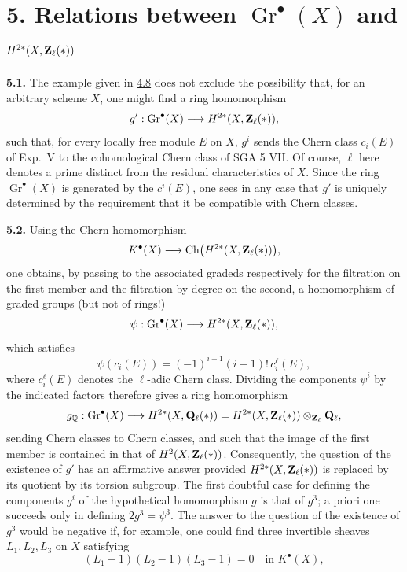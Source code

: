 \section*{5. Relations between $\operatorname{Gr}^\bullet(X)$ and
$H^{2*}(X,\mathbf Z_\ell(*))$}

\noindent{}\textbf{5.1.}
The example given in \hyperlink{sga6.e14.para.4-8}{4.8} does not exclude the possibility that, for an
arbitrary scheme $X$, one might find a ring homomorphism
\[
 g':\operatorname{Gr}^\bullet(X)
 \longrightarrow H^{2*}(X,\mathbf Z_\ell(*)),
\]
such that, for every locally free module $E$ on $X$, $g^i$ sends the Chern
class $c_i(E)$ of Exp.~V to the cohomological Chern class of SGA 5 VII. Of
course, $\ell$ here denotes a prime distinct from the residual
characteristics of $X$. Since the ring $\operatorname{Gr}^\bullet(X)$ is
generated by the $c^i(E)$, one sees in any case that $g'$ is uniquely
determined by the requirement that it be compatible with Chern classes.

\noindent{}\textbf{5.2.}
Using the Chern homomorphism
\[
 K^\bullet(X)\longrightarrow
 \operatorname{Ch}\bigl(H^{2*}(X,\mathbf Z_\ell(*))\bigr),
\]
one obtains, by passing to the associated gradeds respectively for the
filtration on the first member and the filtration by degree on the second,
a homomorphism of graded groups (but not of rings!)
\[
 \psi:\operatorname{Gr}^\bullet(X)
 \longrightarrow H^{2*}(X,\mathbf Z_\ell(*)),
\]
which satisfies
\[
 \psi(c_i(E))=(-1)^{i-1}(i-1)!\,c_i^\ell(E),
\]
where $c_i^\ell(E)$ denotes the $\ell$-adic Chern class. Dividing the
components $\psi^i$ by the indicated factors therefore gives a ring
homomorphism
\[
 g_\mathbb Q:\operatorname{Gr}^\bullet(X)
 \longrightarrow H^{2*}(X,\mathbf Q_\ell(*))
 =H^{2*}(X,\mathbf Z_\ell(*))\otimes_{\mathbf Z_\ell}\mathbf Q_\ell,
\]
sending Chern classes to Chern classes, and such that the image of the first
member is contained in that of $H^2(X,\mathbf Z_\ell(*))$. Consequently, the question
of the existence of $g'$ has an affirmative answer provided
$H^{2*}(X,\mathbf Z_\ell(*))$ is replaced by its quotient by its torsion subgroup.
The first doubtful case for defining the components $g^i$ of the
hypothetical homomorphism $g$ is that of $g^3$; a priori one succeeds only
in defining $2g^3=\psi^3$. The answer to the question of the existence of
$g^3$ would be negative if, for example, one could find three invertible
sheaves $L_1,L_2,L_3$ on $X$ satisfying
\[
 (L_1-1)(L_2-1)(L_3-1)=0
 \quad\text{in }K^\bullet(X),
\]

